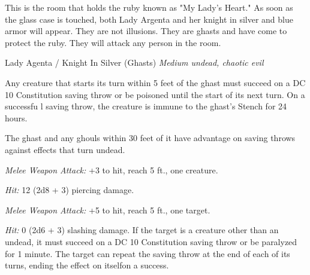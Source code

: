 \documentclass[palace_of_the_silver_princess]{subfiles}
\begin{document}
This is the room that holds the ruby known as "My Lady’s Heart." As soon
as the glass case is touched, both Lady Argenta and her knight in silver
and blue armor will appear. They are not illusions. They are ghasts 
and have come to protect the ruby. They will attack any person in the
room. 

\begin{monsterbox}{Lady Agenta / Knight In Silver (Ghasts)}
	\textit{Medium undead, chaotic evil}\\
	\hline
	\basics[
		armorclass = {13},
		hitpoints = {36 (8d8)},
		speed = {30~ft.}]
	\hline
	\stats[
		STR = \stat{16},
		DEX = \stat{17},
		CON = \stat{10},
		INT = \stat{11},
		WIS = \stat{10},
		CHA = \stat{8}]
	\hline
	\details[
        damageresistances = {necrotic},
        damageimmunities = {poison},
        conditionimmunities = {charmed, exhaustion, poisoned},
		senses = {darkvision 60~ft.passive Perception 10},
		languages = {Common},
		challenge = {2 (450 XP)}]
	\hline
	\begin{monsteraction}[Stench]
        Any creature that starts its turn within 5 feet of the ghast
        must succeed on a DC 10 Constitution saving throw or be poisoned
        until the start of its next turn. On a successfu l saving throw,
        the creature is immune to the ghast's Stench for 24 hours.
	\end{monsteraction}

    \begin{monsteraction}
        The ghast and any ghouls within 30 feet of it have advantage on
        saving throws against effects that turn undead.
    \end{monsteraction}

    \begin{monsteraction}[Bite]
		\textit{Melee Weapon Attack:} +3 to hit, reach 5 ft., one
        creature.

        \textit{Hit:} 12 (2d8 + 3) piercing damage.
	\end{monsteraction}

    \begin{monsteraction}[Claws]
		\textit{Melee Weapon Attack:} +5 to hit, reach 5 ft., one
        target.

        \textit{Hit:} 0 (2d6 + 3) slashing damage. If the target is a
        creature other than an undead, it must succeed on a DC 10
        Constitution saving throw or be paralyzed for 1 minute. The
        target can repeat the saving throw at the end of each of its
        turns, ending the effect on itselfon a success.
	\end{monsteraction}
\end{monsterbox}
\end{document}
